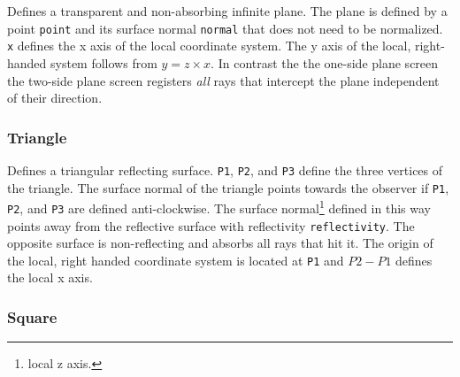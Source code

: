 \documentclass[10pt,a4paper,titlepage]{article}
\begin{document}


Defines a transparent and non-absorbing infinite plane. The plane is defined by a point {\tt point} and its surface normal {\tt normal} that does not need to be normalized. {\tt x} defines the x axis of the local coordinate system. The y axis of the local, right-handed system follows from $y=z \times x$. In contrast the the one-side plane screen the two-side plane screen registers \emph{all} rays that intercept the plane independent of their direction.


\subsubsection{Triangle}







Defines a triangular reflecting surface. {\tt P1}, {\tt P2}, and {\tt P3} define the three vertices of the triangle. The surface normal of the triangle points towards the observer if {\tt P1}, {\tt P2}, and {\tt P3} are defined anti-clockwise. The surface normal\footnote{local z axis.} defined in this way points away from the reflective surface with reflectivity {\tt reflectivity}. The opposite surface is non-reflecting and absorbs all rays that hit it. The origin of the local, right handed coordinate system is located at {\tt P1} and $P2 - P1$ defines the local x axis. 


\subsubsection{Square}






\end{document}

